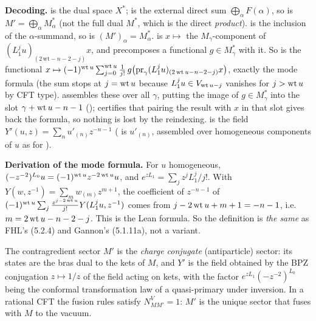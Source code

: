 \begin{dictionary}
\textbf{Decoding.}  is the dual space $X^*$;  is the external direct sum
$\bigoplus_\alpha F(\alpha)$, so  is $M' = \bigoplus_\alpha M_\alpha^*$ (not the full dual $M^*$, which is
the direct \emph{product}).  is the inclusion of the $\alpha$-summand, so
 is $(M')_\alpha = M_\alpha^*$.  is $x\mapsto$ the
$M_\gamma$-component of $(L_1^ju)_{(2\,\mathrm{wt}-n-2-j)}x$, and  precomposes a functional
$g\in M_\gamma^*$ with it. So  is the functional
$x\mapsto(-1)^{\operatorname{wt} u}\sum_{j=0}^{\operatorname{wt} u}\frac1{j!}\,g\big(\mathrm{pr}_\gamma(L_1^ju)_{(2\operatorname{wt} u-n-2-j)}x\big)$, exactly the
mode formula (the sum stops at $j = \operatorname{wt} u$ because $L_1^ju\in V_{\operatorname{wt} u-j}$ vanishes for $j>\operatorname{wt} u$ by CFT type).
 assembles these over all $\gamma$, putting the image of $g\in M_\gamma^*$ into the slot
$\gamma+\operatorname{wt} u-n-1$ ();  certifies that pairing the result with
$x$ in that slot gives back the formula, so nothing is lost by the reindexing.  is the field
$Y'(u,z) = \sum_n u'_{(n)}z^{-n-1}$ ( is $u'_{(n)}$, assembled over homogeneous components of
$u$ as for ).

\textbf{Derivation of the mode formula.} For $u$ homogeneous, $(-z^{-2})^{L_0}u = (-1)^{\operatorname{wt} u}z^{-2\operatorname{wt} u}u$, and
$e^{zL_1} = \sum_j z^jL_1^j/j!$. With $Y(w,z^{-1}) = \sum_m w_{(m)}z^{m+1}$, the coefficient of $z^{-n-1}$ of
$(-1)^{\operatorname{wt} u}\sum_j\frac{z^{j-2\operatorname{wt} u}}{j!}Y(L_1^ju,z^{-1})$ comes from $j-2\operatorname{wt} u+m+1 = -n-1$, i.e.\
$m = 2\operatorname{wt} u-n-2-j$. This is the Lean formula. So the definition is \emph{the same} as FHL's (5.2.4) and Gannon's
(5.1.11a), not a variant.
\end{dictionary}

\begin{physics}
The contragredient sector $M'$ is the \emph{charge conjugate} (antiparticle) sector: its states are the bras
dual to the kets of $M$, and $Y'$ is the field obtained by the BPZ conjugation $z\mapsto 1/z$ of the field acting
on kets, with the factor $e^{zL_1}(-z^{-2})^{L_0}$ being the conformal transformation law of a quasi-primary under
inversion. In a rational CFT the fusion rules satisfy $N_{MM'}^V = 1$: $M'$ is the unique sector that fuses with
$M$ to the vacuum.
\end{physics}

